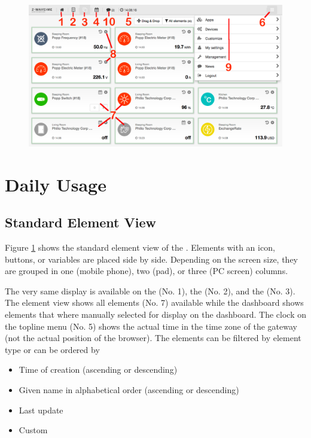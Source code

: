 \begin{figure}
\begin{center}
\includegraphics[width=1.0\textwidth]{pngs/cap4/shui1a.png}
\caption{\zwshui}
\label{sh2}
\end{center}
\end{figure}


\section{\zwshui Daily Usage}

 
\subsection{Standard Element View}

Figure \ref{sh2} shows the standard element view of the \zwshui. 
Elements with an icon, buttons, or variables are placed side by side. Depending on the 
screen size, they are grouped in one (mobile phone), two (pad), or three (PC screen) 
columns.

The very same display is available on the  (No. 1), the  (No. 2), 
and the  (No. 3). The element view shows all elements (No. 7) available
while the dashboard shows elements that where manually selected for display on the 
dashboard. The clock on the topline menu (No. 5) shows the actual time in the time 
zone of the gateway (not the actual position of the browser). The elements can be filtered 
by element type or can be ordered by

\begin{itemize}
\item Time of creation (ascending or descending)
\item Given name in alphabetical order (ascending or descending)
\item Last update
\item Custom
\end{itemize}

